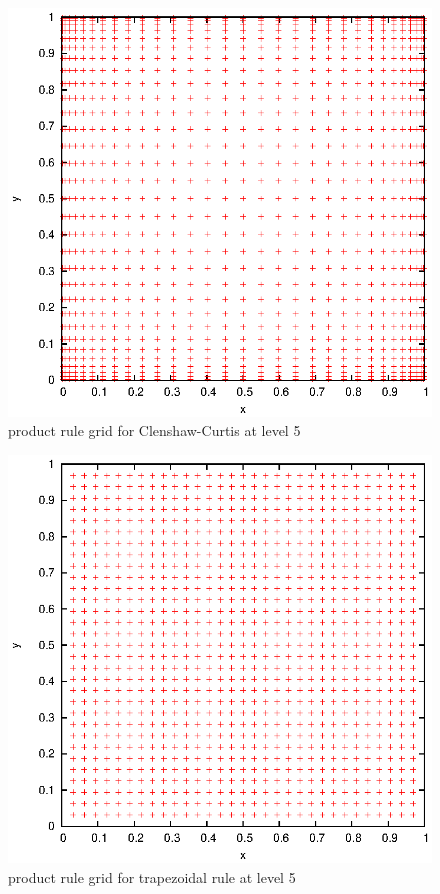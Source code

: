 \documentclass[]{article}
\begin{document}
\begin{figure}[!ht]
\includegraphics[width=.9\textwidth]{task9_cc}
\caption{product rule grid for Clenshaw-Curtis at level 5}
\label{fig:Task9b}
\end{figure}

\begin{figure}[!ht]
\includegraphics[width=.9\textwidth]{task9_trapezoidal}
\caption{product rule grid for trapezoidal rule at level 5}
\label{fig:Task9c}
\end{figure}
\clearpage
\end{document}
